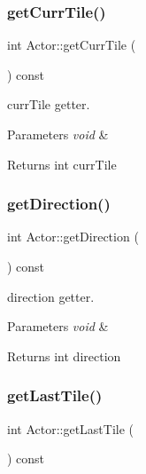 \subsubsection{\texorpdfstring{get\+Curr\+Tile()}{getCurrTile()}}
{\footnotesize\ttfamily int Actor\+::get\+Curr\+Tile (\begin{DoxyParamCaption}{ }\end{DoxyParamCaption}) const}



curr\+Tile getter. 


\begin{DoxyParams}{Parameters}
{\em void} & \\
\hline
\end{DoxyParams}
\begin{DoxyReturn}{Returns}
int curr\+Tile 
\end{DoxyReturn}
\mbox{\label{class_actor_a20bb92df0514cc00b31cb1a046548964}} 
\subsubsection{\texorpdfstring{get\+Direction()}{getDirection()}}
{\footnotesize\ttfamily int Actor\+::get\+Direction (\begin{DoxyParamCaption}{ }\end{DoxyParamCaption}) const}



direction getter. 


\begin{DoxyParams}{Parameters}
{\em void} & \\
\hline
\end{DoxyParams}
\begin{DoxyReturn}{Returns}
int direction 
\end{DoxyReturn}
\mbox{\label{class_actor_a7867adac1be8ea6273808dda395a4170}} 
\subsubsection{\texorpdfstring{get\+Last\+Tile()}{getLastTile()}}
{\footnotesize\ttfamily int Actor\+::get\+Last\+Tile (\begin{DoxyParamCaption}{ }\end{DoxyParamCaption}) const}



